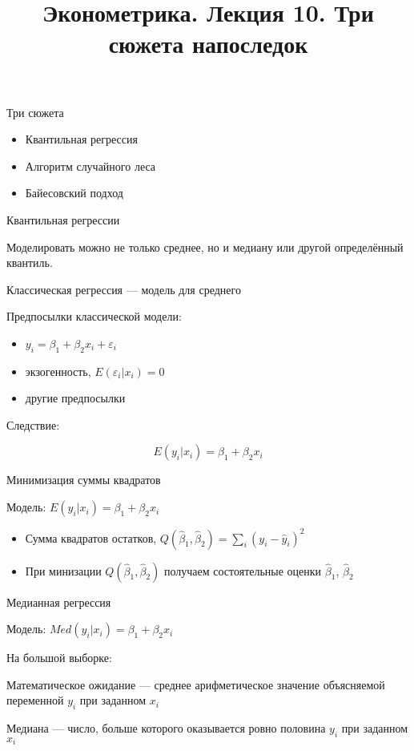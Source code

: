 \documentclass[ignorenonframetext,]{beamer}
\title{Эконометрика. Лекция 10. Три сюжета напоследок}
\date{}
\newcommand{\e}{\varepsilon}
\newcommand{\hy}{\hat{y}}
\newcommand{\hb}{\hat{\beta}}
\begin{document}
\frame{\titlepage}

\begin{frame}{Три сюжета}

\begin{itemize}
\item
  Квантильная регрессия
\item
  Алгоритм случайного леса
\item
  Байесовский подход
\end{itemize}

\end{frame}

\begin{frame}{Квантильная регрессии}

Моделировать можно не только среднее, но и медиану или другой
определённый квантиль.

\end{frame}

\begin{frame}{Классическая регрессия --- модель для среднего}

Предпосылки классической модели:

\begin{itemize}
\item
  \(y_i=\beta_1 + \beta_2 x_i + \e_i\)
\item
  экзогенность, \(E(\e_i | x_i)=0\)
\item
  другие предпосылки
\end{itemize}

Следствие:

\[
E(y_i|x_i)=\beta_1 + \beta_2 x_i
\]

\end{frame}

\begin{frame}{Минимизация суммы квадратов}

Модель: \(E(y_i|x_i)=\beta_1 + \beta_2 x_i\)

\begin{itemize}
\item
  Сумма квадратов остатков, \(Q(\hb_1,\hb_2)=\sum_i (y_i - \hy_i)^2\)
\item
  При минизации \(Q(\hb_1,\hb_2)\) получаем состоятельные оценки
  \(\hb_1\), \(\hb_2\)
\end{itemize}

\end{frame}

\begin{frame}{Медианная регрессия}

Модель: \(Med(y_i|x_i)=\beta_1 + \beta_2 x_i\)

На большой выборке:

Математическое ожидание --- среднее арифметическое значение объясняемой
переменной \(y_i\) при заданном \(x_i\)

Медиана --- число, больше которого оказывается ровно половина \(y_i\)
при заданном \(x_i\)

\end{frame}
\end{document}
